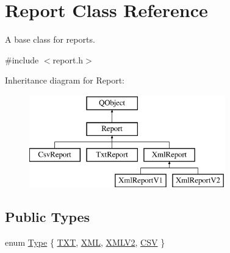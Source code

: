 \hypertarget{class_report}{\section{Report Class Reference}
\label{class_report}
}


A base class for reports.  




{\ttfamily \#include $<$report.\-h$>$}

Inheritance diagram for Report\-:\begin{figure}[H]
\begin{center}
\leavevmode
\includegraphics[height=4.000000cm]{class_report}
\end{center}
\end{figure}
\subsection*{Public Types}
\begin{DoxyCompactItemize}
\item 
enum \hyperlink{class_report_a7849fcf198f06b2f94420312e43ec10c}{Type} \{ \hyperlink{class_report_a7849fcf198f06b2f94420312e43ec10cad6966ee4771e5de35e5e65caa2ea3459}{T\-X\-T}, 
\hyperlink{class_report_a7849fcf198f06b2f94420312e43ec10ca34d09774e451f9ceb7e1d7862f8200a2}{X\-M\-L}, 
\hyperlink{class_report_a7849fcf198f06b2f94420312e43ec10ca6558de9645452724f83d48e14a16671f}{X\-M\-L\-V2}, 
\hyperlink{class_report_a7849fcf198f06b2f94420312e43ec10ca1b1c3875448e1ddf8f4964e4200a7f13}{C\-S\-V}
 \}
\end{DoxyCompactItemize}
